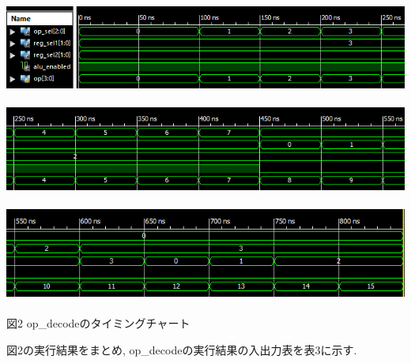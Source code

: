 \documentclass[12pt]{jreport}
\begin{document}
        \begin{center}
            \includegraphics[width=18cm]{op_decode_1.png} \\　\\
            \includegraphics[width=18cm]{op_decode_2.png} \\　\\
            \includegraphics[width=18cm]{op_decode_3.png} \\　\\
                図2 op\_decodeのタイミングチャート
        \end{center} 
        \newpage

        図2の実行結果をまとめ, op\_decodeの実行結果の入出力表を表3に示す. 
\end{document}
